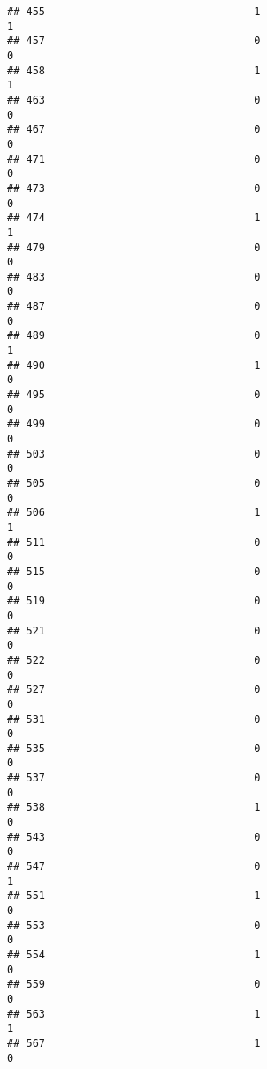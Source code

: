\documentclass[
]{article}
\begin{document}
\begin{verbatim}
## 455                                 1                                1
## 457                                 0                                0
## 458                                 1                                1
## 463                                 0                                0
## 467                                 0                                0
## 471                                 0                                0
## 473                                 0                                0
## 474                                 1                                1
## 479                                 0                                0
## 483                                 0                                0
## 487                                 0                                0
## 489                                 0                                1
## 490                                 1                                0
## 495                                 0                                0
## 499                                 0                                0
## 503                                 0                                0
## 505                                 0                                0
## 506                                 1                                1
## 511                                 0                                0
## 515                                 0                                0
## 519                                 0                                0
## 521                                 0                                0
## 522                                 0                                0
## 527                                 0                                0
## 531                                 0                                0
## 535                                 0                                0
## 537                                 0                                0
## 538                                 1                                0
## 543                                 0                                0
## 547                                 0                                1
## 551                                 1                                0
## 553                                 0                                0
## 554                                 1                                0
## 559                                 0                                0
## 563                                 1                                1
## 567                                 1                                0

\end{verbatim}
\end{document}
